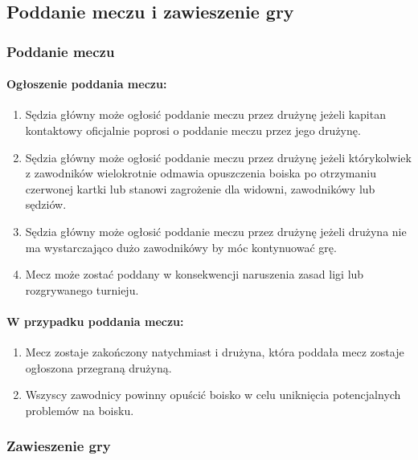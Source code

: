 \documentclass[12pt]{article}
\begin{document}
\subsection{Poddanie meczu i zawieszenie gry}

\subsubsection{Poddanie meczu}

\paragraph{Ogłoszenie poddania meczu:}

\begin{enumerate}
\item
    Sędzia główny może ogłosić poddanie meczu przez drużynę jeżeli kapitan
  kontaktowy oficjalnie poprosi o poddanie meczu przez jego drużynę.
  \item
    Sędzia główny może ogłosić poddanie meczu przez drużynę jeżeli
  którykolwiek z zawodników wielokrotnie odmawia opuszczenia boiska po
  otrzymaniu czerwonej kartki lub stanowi zagrożenie dla widowni,
  zawodnikówy lub sędziów.
  \item
    Sędzia główny może ogłosić poddanie meczu przez drużynę jeżeli drużyna
  nie ma wystarczająco dużo zawodnikówy by móc kontynuować grę.
  \item
    Mecz może zostać poddany w konsekwencji naruszenia zasad ligi lub
  rozgrywanego turnieju.
  \end{enumerate}

\paragraph{W przypadku poddania meczu:}

\begin{enumerate}
\item
    Mecz zostaje zakończony natychmiast i drużyna, która poddała mecz
  zostaje ogłoszona przegraną drużyną.
  \item
    Wszyscy zawodnicy powinny opuścić boisko w celu uniknięcia
  potencjalnych problemów na boisku.
  \end{enumerate}

\subsubsection{Zawieszenie gry}
\end{document}
